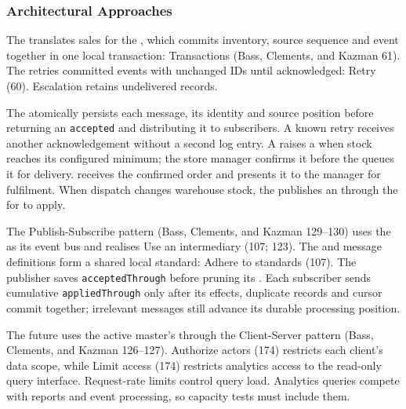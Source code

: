 \subsubsection{Architectural Approaches}
\label{sec:approaches}

The \POSAdapter translates sales for the \StoreAgent, which commits inventory,
source sequence and \Outbox event together in one local transaction: Transactions (Bass, Clements,
and Kazman 61). The \Outbox retries committed events with unchanged IDs until
acknowledged: Retry (60). Escalation retains undelivered records.

The \CFE atomically persists each message, its identity and source position before
returning an \texttt{accepted} \Acknowledgement and distributing it to subscribers.
A known retry receives another acknowledgement without a second log entry.
A \StoreAgent raises a
\ShippingOrder when stock reaches its configured minimum; the store manager confirms
it before the \Outbox queues it for delivery. \ShippingOrderFulfillment receives the
confirmed order and presents it to the \DC manager for fulfilment. When dispatch
changes warehouse stock, the \DCAgent publishes an \InventoryEvent through the
\CFE for \CentralMasterInventory to apply.

The Publish-Subscribe pattern (Bass, Clements, and Kazman 129--130) uses the \CFE
as its event bus and realises Use an intermediary (107; 123). The \IEP and
message definitions form a shared local standard: Adhere to standards (107).
The publisher saves
\texttt{acceptedThrough} before pruning its \Outbox. Each subscriber sends cumulative
\texttt{appliedThrough} only after its effects, duplicate records and cursor commit
together; irrelevant messages still advance its durable processing position.

The future \AnalyticsClient uses the active master's \InventoryQuery through the
Client-Server pattern (Bass, Clements, and Kazman 126--127). Authorize actors (174)
restricts each client's data scope, while Limit access (174) restricts analytics
access to the read-only query interface. Request-rate limits control query load.
Analytics queries compete with reports and event processing, so capacity tests must
include them.


